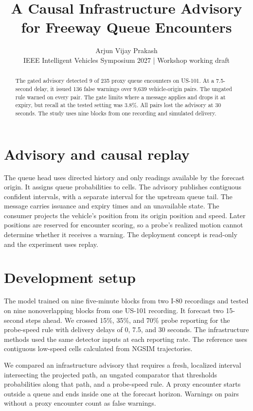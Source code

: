 \documentclass[conference]{IEEEtran}
\title{A Causal Infrastructure Advisory for Freeway Queue Encounters}
\author{Arjun Vijay Prakash \\ \small IEEE Intelligent Vehicles Symposium 2027 | Workshop
working draft}
\begin{document}
\maketitle
\begin{abstract}
The gated advisory detected 9 of 235 proxy queue encounters on US-101. At a 7.5-second
delay, it issued 136 false warnings over 9,639 vehicle-origin pairs. The ungated rule
warned on every pair. The gate limits where a message applies and drops it at expiry,
but recall at the tested setting was 3.8\%. All pairs lost the advisory at 30 seconds.
The study uses nine blocks from one recording and simulated delivery.
\end{abstract}

\section*{Advisory and causal replay}
The queue head uses directed history and only readings available by the forecast origin. It
assigns queue probabilities to cells. The advisory publishes contiguous confident intervals,
with a separate interval for the upstream queue tail. The message carries issuance and expiry
times and an unavailable state. The consumer projects the vehicle's position from its origin
position and speed. Later positions are reserved for encounter scoring, so a probe's realized
motion cannot determine whether it receives a warning. The deployment concept is read-only and
the experiment uses replay.

\section*{Development setup}
The model trained on nine five-minute blocks from two I-80 recordings and tested on nine
nonoverlapping blocks from one US-101 recording. It forecast two 15-second steps ahead.
We crossed 15\%, 35\%, and 70\% probe reporting for the probe-speed rule with delivery
delays of 0, 7.5, and 30 seconds. The infrastructure methods used the same detector inputs at
each reporting rate.
The reference uses contiguous low-speed cells calculated from NGSIM trajectories.

We compared an infrastructure advisory that requires a fresh, localized interval intersecting
the projected path, an ungated comparator that thresholds probabilities along that path, and a
probe-speed rule. A proxy encounter starts outside a queue and ends inside one at the forecast
horizon. Warnings on pairs without a proxy encounter count as false warnings.
\end{document}
